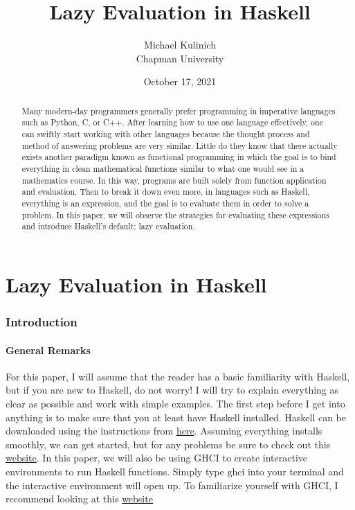 \documentclass{article}
\title{Lazy Evaluation in Haskell}
\author{Michael Kulinich  \\ Chapman University}
\date{October 17, 2021}
\begin{document}
\maketitle

\begin{abstract}

\medskip\noindent
Many modern-day programmers generally prefer programming in imperative languages such as Python, C, or C++. After learning how to use one language effectively, one can swiftly start working with other languages because the thought process and method of answering problems are very similar. Little do they know that there actually exists another paradigm known as functional programming in which the goal is to bind everything in clean mathematical functions similar to what one would see in a mathematics course. In this way, programs are built solely from function application and evaluation. Then to break it down even more, in languages such as Haskell, everything is an expression, and the goal is to evaluate them in order to solve a problem. In this paper, we will observe the strategies for evaluating these expressions and introduce Haskell's default: lazy evaluation.
\end{abstract}

\tableofcontents

\part{Lazy Evaluation in Haskell}
\section{Introduction}\label{intro}

\subsection{General Remarks}

\medskip\noindent
For this paper, I will assume that the reader has a basic familiarity with Haskell, but if you are new to Haskell, do not worry! I will try to explain everything as clear as possible and work with simple examples. The first step before I get into anything is to make sure that you at least have Haskell installed. Haskell can be downloaded using the instructions from \href{https://hackmd.io/@alexhkurz/Hk86XnCzD}{here}. Assuming everything installs smoothly, we can get started, but for any problems be sure to check out this \href{https://www.haskell.org/platform/}{website}. In this paper, we will also be using GHCI to create interactive environments to run Haskell functions. Simply type $\textrm{ghci}$ into your terminal and the interactive environment will open up. To familiarize yourself with GHCI, I recommend looking at this \href{https://downloads.haskell.org/~ghc/9.0.1/docs/html/users_guide/ghci.html}{website}
\end{document}
